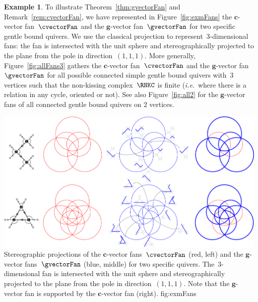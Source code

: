 \documentclass{memo-l}
\theoremstyle{definition}
\newtheorem{example}[theorem]{Example}
\renewcommand{\b}[1]{\mathbf{#1}} %
\newcommand{\fref}[1]{Figure~\ref{#1}} %
\newcommand{\ie}{\textit{i.e.}~} %
\begin{document}
\begin{example}
To illustrate Theorem~\ref{thm:gvectorFan} and Remark~\ref{rem:cvectorFan}, we have represented in \fref{fig:exmFans} the $\b{c}$-vector fan~$\cvectorFan$ and the $\b{g}$-vector fan~$\gvectorFan$ for two specific gentle bound quivers.
We use the classical projection to represent~$3$-dimensional fans: the fan is intersected with the unit sphere and stereographically projected to the plane from the pole in direction~$(1,1,1)$.
More generally, \fref{fig:allFans3} gathers the $\b{c}$-vector fan~$\cvectorFan$ and the $\b{g}$-vector fan~$\gvectorFan$ for all possible connected simple gentle bound quivers with~$3$ vertices such that the non-kissing complex~$\RNKC$ is finite (\ie where there is a relation in any cycle, oriented or not).
See also \fref{fig:all2} for the $\b{g}$-vector fans of all connected gentle bound quivers on $2$ vertices.

\captionsetup{width=1.5\textwidth}
{\includegraphics[scale=.5]{exmFans}}
{Stereographic projections of the $\b{c}$-vector fans~$\cvectorFan$ (red, left) and the $\b{g}$-vector fans~$\gvectorFan$ (blue, middle) for two specific quivers. The~$3$-dimensional fan is intersected with the unit sphere and stereographically projected to the plane from the pole in direction~$(1,1,1)$. Note that the $\b{g}$-vector fan is supported by the $\b{c}$-vector fan (right).}
{fig:exmFans}
\captionsetup{width=\textwidth}

\end{example}
\end{document}
